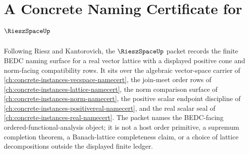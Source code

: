 \chapter{A Concrete Naming Certificate for $\RieszSpaceUp$}
\label{ch:concrete-instances-riesz-space-namecert}

Following Riesz and Kantorovich, the $\RieszSpaceUp$ packet records the finite BEDC naming surface for a real vector lattice with a displayed positive cone and norm-facing compatibility rows. It sits over the algebraic vector-space carrier of \autoref{ch:concrete-instances-vecspace-namecert}, the join-meet order rows of \autoref{ch:concrete-instances-lattice-namecert}, the norm comparison surface of \autoref{ch:concrete-instances-norm-namecert}, the positive scalar endpoint discipline of \autoref{ch:concrete-instances-positivereal-namecert}, and the real scalar seal of \autoref{ch:concrete-instances-real-namecert}. The packet names the BEDC-facing ordered-functional-analysis object; it is not a host order primitive, a supremum completion theorem, a Banach-lattice completeness claim, or a choice of lattice decompositions outside the displayed finite ledger.

